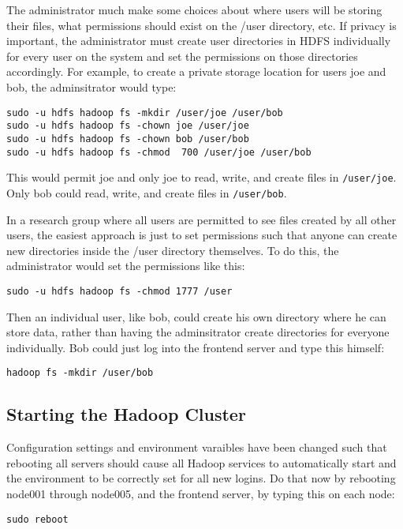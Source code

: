 The administrator much make some choices about where users will be storing
their files, what permissions should exist on the /user directory, etc.  If
privacy is important, the administrator must create user directories in
HDFS individually for every user on the system and set the permissions
on those directories accordingly.  For example, to create a private
storage location for users joe and bob, the adminsitrator would type:

\begin{verbatim}
sudo -u hdfs hadoop fs -mkdir /user/joe /user/bob
sudo -u hdfs hadoop fs -chown joe /user/joe
sudo -u hdfs hadoop fs -chown bob /user/bob
sudo -u hdfs hadoop fs -chmod  700 /user/joe /user/bob
\end{verbatim}

This would permit joe and only joe to read, write, and create files
in \verb|/user/joe|.  Only bob could read, write, and create files in
\verb|/user/bob|.

In a research group where all users are permitted to see files created by
all other users, the easiest approach is just to set permissions such that
anyone can create new directories inside the /user directory themselves.
To do this, the administrator would set the permissions like this:

\begin{verbatim}
sudo -u hdfs hadoop fs -chmod 1777 /user
\end{verbatim}

Then an individual user, like bob, could create his own directory where he
can store data, rather than having the adminsitrator create directories
for everyone individually.  Bob could just log into the frontend server
and type this himself:

\begin{verbatim}
hadoop fs -mkdir /user/bob
\end{verbatim}


\subsection{Starting the Hadoop Cluster}
Configuration settings and environment varaibles have been changed
such that rebooting all servers should cause all Hadoop services to
automatically start and the environment to be correctly set for all new
logins.  Do that now by rebooting node001 through node005, and the frontend
server, by typing this on each node:

\begin{verbatim}
sudo reboot
\end{verbatim}

